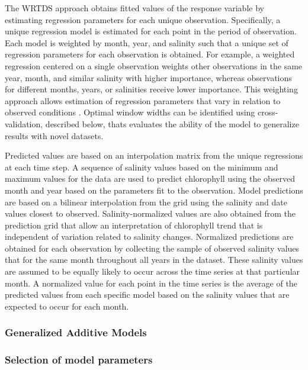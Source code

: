 \documentclass[letterpaper,12pt,oneside]{article}\usepackage[]{graphicx}\usepackage[]{color}
\begin{document}
The \ac{WRTDS} approach obtains fitted values of the response variable by estimating regression parameters for each unique observation. Specifically, a unique regression model is estimated for each point in the period of observation. Each model is weighted by month, year, and salinity such that a unique set of regression parameters for each observation is obtained. For example, a weighted regression centered on a single observation weights other observations in the same year, month, and similar salinity with higher importance, whereas observations for different months, years, or salinities receive lower importance. This weighting approach allows estimation of regression parameters that vary in relation to observed conditions \citep{Hirsch10}. Optimal window widths can be identified using cross-validation, described below, thats evaluates the ability of the model to generalize results with novel datasets.

Predicted values are based on an interpolation matrix from the unique regressions at each time step. A sequence of salinity values based on the minimum and maximum values for the data are used to predict chlorophyll using the observed month and year based on the parameters fit to the observation. Model predictions are based on a bilinear interpolation from the grid using the salinity and date values closest to observed. Salinity-normalized values are also obtained from the prediction grid that allow an interpretation of chlorophyll trend that is independent of variation related to salinity changes. Normalized predictions are obtained for each observation by collecting the sample of observed salinity values that for the same month throughout all years in the dataset.  These salinity values are assumed to be equally likely to occur across the time series at that particular month. A normalized value for each point in the time series is the average of the predicted values from each specific model based on the salinity values that are expected to occur for each month.

\subsubsection{Generalized Additive Models}

\subsubsection{Selection of model parameters}
\end{document}
